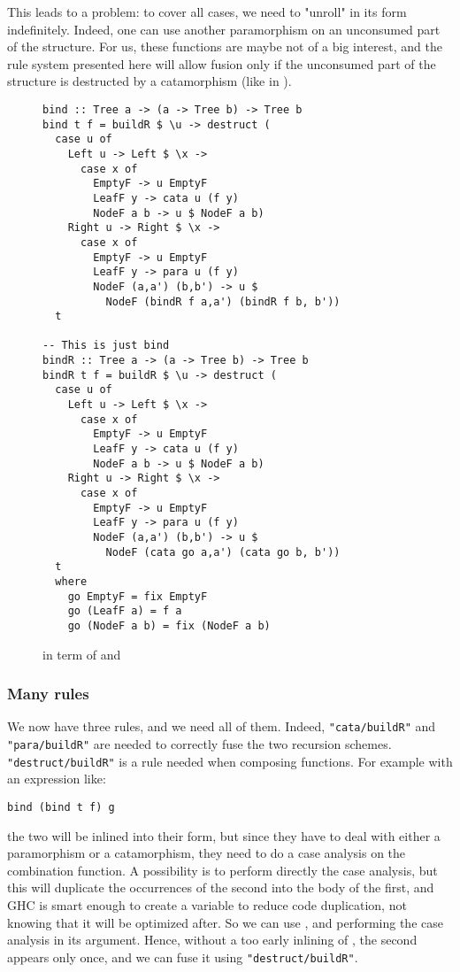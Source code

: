 This leads to a problem: to cover all cases, we need to "unroll"  in its  form indefinitely. Indeed, one can use another paramorphism on an unconsumed part of the structure. For us, these functions are maybe not of a big interest, and the rule system presented here will allow fusion only if the unconsumed part of the structure is destructed by a catamorphism (like in ).

\begin{figure}
\begin{verbatim}
bind :: Tree a -> (a -> Tree b) -> Tree b
bind t f = buildR $ \u -> destruct (
  case u of
    Left u -> Left $ \x ->
      case x of
        EmptyF -> u EmptyF
        LeafF y -> cata u (f y)
        NodeF a b -> u $ NodeF a b)
    Right u -> Right $ \x ->
      case x of
        EmptyF -> u EmptyF
        LeafF y -> para u (f y)
        NodeF (a,a') (b,b') -> u $
          NodeF (bindR f a,a') (bindR f b, b'))
  t

-- This is just bind
bindR :: Tree a -> (a -> Tree b) -> Tree b
bindR t f = buildR $ \u -> destruct (
  case u of
    Left u -> Left $ \x ->
      case x of
        EmptyF -> u EmptyF
        LeafF y -> cata u (f y)
        NodeF a b -> u $ NodeF a b)
    Right u -> Right $ \x ->
      case x of
        EmptyF -> u EmptyF
        LeafF y -> para u (f y)
        NodeF (a,a') (b,b') -> u $
          NodeF (cata go a,a') (cata go b, b'))
  t
  where
    go EmptyF = fix EmptyF
    go (LeafF a) = f a
    go (NodeF a b) = fix (NodeF a b)

\end{verbatim}
\caption{ in term of  and }
\label{fig:bindbuild}
\end{figure}

\subsubsection{Many rules}
We now have three rules, and we need all of them. Indeed, \verb|"cata/buildR"| and \verb|"para/buildR"| are needed to correctly fuse the two recursion schemes. \verb|"destruct/buildR"| is a rule needed when composing functions. For example with an expression like:
\begin{verbatim}
bind (bind t f) g
\end{verbatim}
\noindent the two  will be inlined into their  form, but since they have to deal with either a paramorphism or a catamorphism, they need to do a case analysis on the combination function. A possibility is to perform directly the case analysis, but this will duplicate the occurrences of the second  into the body of the first, and GHC is smart enough to create a variable to reduce code duplication, not knowing that it will be optimized after. So we can use , and performing the case analysis in its argument. Hence, without a too early inlining of , the second  appears only once, and we can fuse it using \verb|"destruct/buildR"|.

